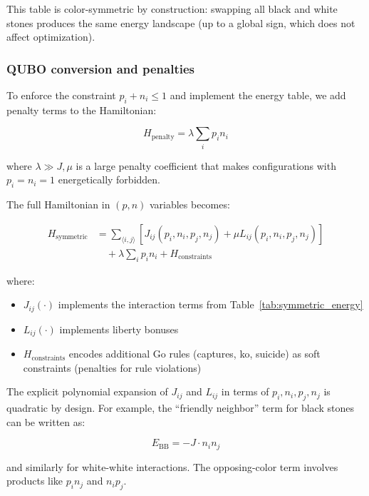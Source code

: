 \documentclass[aps,prl,reprint]{revtex4-2}
\begin{document}
This table is color-symmetric by construction: swapping all black and white stones produces the same energy landscape (up to a global sign, which does not affect optimization).

\subsubsection{QUBO conversion and penalties}

To enforce the constraint $p_i + n_i \leq 1$ and implement the energy table, we add penalty terms to the Hamiltonian:

\begin{equation}
H_{\text{penalty}} = \lambda \sum_i p_i n_i
\end{equation}

where $\lambda \gg J, \mu$ is a large penalty coefficient that makes configurations with $p_i = n_i = 1$ energetically forbidden.

The full Hamiltonian in $(p, n)$ variables becomes:

\begin{align}
H_{\text{symmetric}} &= \sum_{\langle i,j \rangle} \left[ J_{ij}(p_i, n_i, p_j, n_j) + \mu L_{ij}(p_i, n_i, p_j, n_j) \right] \nonumber \\
&\quad + \lambda \sum_i p_i n_i + H_{\text{constraints}}
\label{eq:symmetric_hamiltonian}
\end{align}

where:
\begin{itemize}
	\item $J_{ij}(\cdot)$ implements the interaction terms from Table~\ref{tab:symmetric_energy}
	\item $L_{ij}(\cdot)$ implements liberty bonuses
	\item $H_{\text{constraints}}$ encodes additional Go rules (captures, ko, suicide) as soft constraints (penalties for rule violations)
\end{itemize}

The explicit polynomial expansion of $J_{ij}$ and $L_{ij}$ in terms of $p_i, n_i, p_j, n_j$ is quadratic by design. For example, the ``friendly neighbor'' term for black stones can be written as:

\begin{equation}
E_{\text{BB}} = -J \cdot n_i n_j
\end{equation}

and similarly for white-white interactions. The opposing-color term involves products like $p_i n_j$ and $n_i p_j$.
\end{document}
